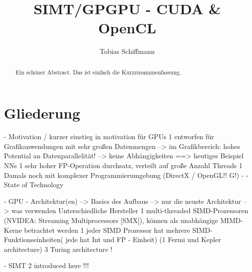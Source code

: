 \documentclass[a4paper,12pt]{llncs}
\numberwithin{equation}{section}
\begin{document}


\author{Tobias Schiffmann}

\title{SIMT/GPGPU - CUDA \& OpenCL}

\maketitle

\thispagestyle{empty}

\begin{abstract}
Ein schöner Abstract. Das ist einfach die Kurzzusammenfassung.
\end{abstract}


\section{Gliederung}
- Motivation / kurzer einstieg in motivation für GPUs
  1 entworfen für Grafikanwendungen mit sehr großen Datenmengen
    --> im Grafikbereich: hohes Potential an Datenparallelität! --> keine Abhängigkeiten
    ==> heutiges Beispiel NNs
  1 sehr hoher FP-Operation durchsatz, verteilt auf große Anzahl Threads
  1 Damals noch mit komplexer Programmierumgebung (DirectX / OpenGL!! G!)
  -   
- State of Technology 
    
  - GPU - Architektur(en)
    --> Basics des Aufbaus
    --> nur die neuste Architektur
    --> was verwenden Unterschiedliche Hersteller
    1 multi-threaded SIMD-Prozessoren (NVIDEA: Streaming Multiprocessors [SMX]), können als unabhängige MIMD-Kerne betrachtet werden
    1 jeder SIMD Prozessor hat mehrere SIMD-Funktionseinheiten( jede hat Int und FP - Einheit)
    (1 Fermi und Kepler architecture)
    3 Turing architecture !

  - SIMT
    2 introduced here !!!
    
\end{document}
